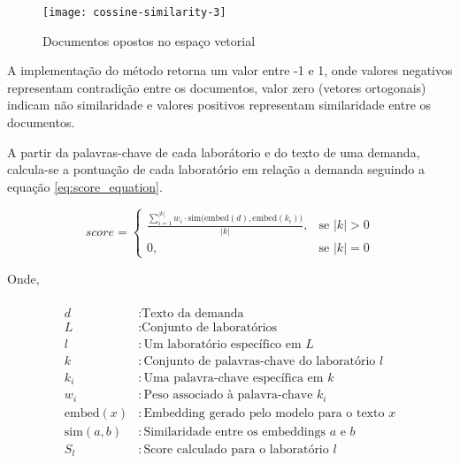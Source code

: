 \begin{figure}[H]
    \caption{Documentos opostos no espaço vetorial}
    \texttt{[image: cossine-similarity-3]}
    \label{fig:cossine_similarity_3}
\end{figure}

A implementação do método retorna um valor entre -1 e 1, onde valores negativos representam contradição entre os documentos, valor zero (vetores ortogonais) indicam não similaridade e valores positivos representam similaridade entre os documentos.

A partir da palavras-chave de cada laborátorio e do texto de uma demanda, calcula-se a pontuação de cada laboratório em relação a demanda seguindo a equação \ref{eq:score_equation}.

\begin{equation}
    \label{eq:score_equation}
    score =
    \begin{cases}
        \frac{\sum_{i=1}^{|k|} w_i \cdot \text{sim}\big(\text{embed}(d), \text{embed}(k_i)\big)}{|k|}, & \text{se } |k| > 0 \\
        0,                                                                                             & \text{se } |k| = 0
    \end{cases}
\end{equation}

Onde,

\begin{align*}                                                                                 \\
    d                & : \text{Texto da demanda}                          \\
    L                & : \text{Conjunto de laboratórios}                    \\
    l                & : \text{Um laboratório específico em } L                                  \\
    k                & : \text{Conjunto de palavras-chave do laboratório } l \\
    k_i              & : \text{Uma palavra-chave específica em } k                               \\
    w_i              & : \text{Peso associado à palavra-chave } k_i                              \\
    \text{embed}(x)  & : \text{Embedding gerado pelo modelo para o texto } x                     \\
    \text{sim}(a, b) & : \text{Similaridade entre os embeddings } a \text{ e } b                 \\
    S_l              & : \text{Score calculado para o laboratório } l
\end{align*}

